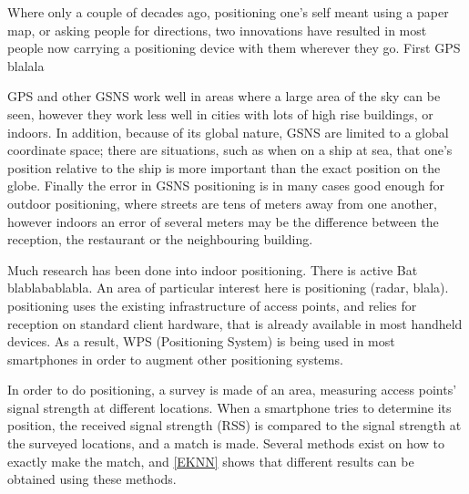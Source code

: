 Where only a couple of decades ago, positioning one's self meant using a paper map, or asking people for directions, two innovations have resulted in most people now carrying a positioning device with them wherever they go.
First GPS  blalala


GPS and other GSNS work well in areas where a large area of the sky can be seen, however they work less well in cities with lots of high rise buildings, or indoors.
In addition, because of its global nature, GSNS are limited to a global coordinate space; there are situations, such as when on a ship at sea, that one's position relative to the ship is more important than the exact position on the globe.
Finally the error in GSNS positioning is in many cases good enough for outdoor positioning, where streets are tens of meters away from one another, however indoors an error of several meters may be the difference between the reception, the restaurant or the neighbouring building.

Much research has been done into indoor positioning. There is active Bat blablabablabla.
An area of particular interest here is \wifi positioning (radar, blala).
\Wifi positioning uses the existing infrastructure of \wifi access points, and relies for reception on standard \wifi client hardware, that is already available in most handheld devices.
As a result, WPS (\Wifi Positioning System) is being used in most smartphones in order to augment other positioning systems.

In order to do \wifi positioning, a survey is made of an area, measuring \wifi access points' signal strength at different locations.
When a smartphone tries to determine its position, the received signal strength (RSS) is compared to the signal strength at the surveyed locations, and a match is made.
Several methods exist on how to exactly make the match, and \ref{EKNN} shows that different results can be obtained using these methods.








